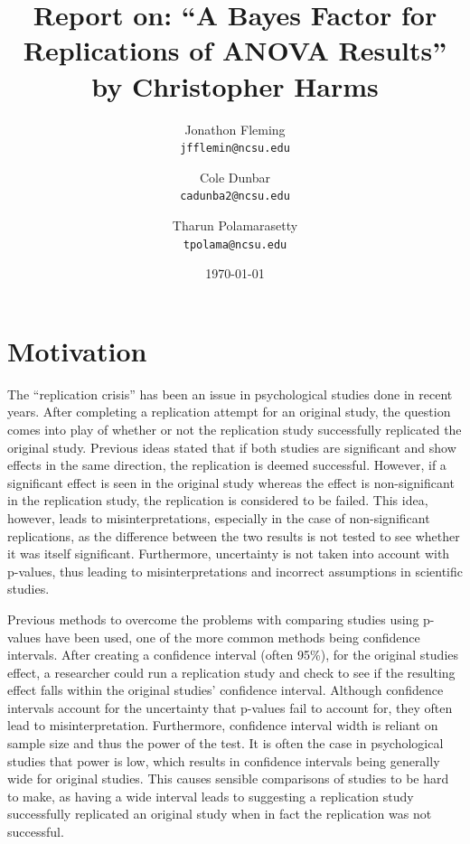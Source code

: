 \documentclass[11pt]{article}
\title{Report on: “A Bayes Factor for Replications of ANOVA Results” by Christopher Harms
}
\author{Jonathon Fleming\\
    {\texttt{jfflemin@ncsu.edu}}  
\and Cole Dunbar\\
    {\texttt{cadunba2@ncsu.edu}} 
\and Tharun Polamarasetty\\
    {\texttt{tpolama@ncsu.edu}}
}
\date{\today}
\begin{document}
\maketitle

\section{Motivation}

The “replication crisis” has been an issue in psychological studies done in recent years. After completing a replication attempt for an original study, the question comes into play of whether or not the replication study successfully replicated the original study. Previous ideas stated that if both studies are significant and show effects in the same direction, the replication is deemed successful. However, if a significant effect is seen in the original study whereas the effect is non-significant in the replication study, the replication is considered to be failed. This idea, however, leads to misinterpretations, especially in the case of non-significant replications, as the difference between the two results is not tested to see whether it was itself significant. Furthermore, uncertainty is not taken into account with p-values, thus leading to misinterpretations and incorrect assumptions in scientific studies.  

Previous methods to overcome the problems with comparing studies using p-values have been used, one of the more common methods being confidence intervals. After creating a confidence interval (often 95\%), for the original studies effect, a researcher could run a replication study and check to see if the resulting effect falls within the original studies' confidence interval. Although confidence intervals account for the uncertainty that p-values fail to account for, they often lead to misinterpretation. Furthermore, confidence interval width is reliant on sample size and thus the power of the test. It is often the case in psychological studies that power is low, which results in confidence intervals being generally wide for original studies. This causes sensible comparisons of studies to be hard to make, as having a wide interval leads to suggesting a replication study successfully replicated an original study when in fact the replication was not successful.
\end{document}
